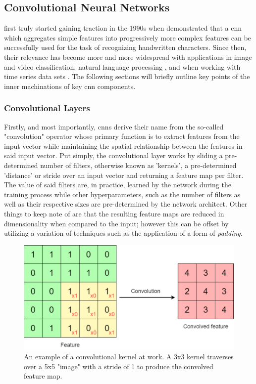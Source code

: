\subsection{Convolutional Neural Networks}
\label{subsec:Background-Information:Forecasting-Models:Convolutional-Neural-Networks}
 first truly started gaining traction in the 1990s when \citet{LeCun} demonstrated that a \gls{cnn} which aggregates simple features into progressively more complex features can be successfully used for the task of recognizing handwritten characters. Since then, their relevance has become more and more widespread with applications in image and video classification, natural language processing \cite{Collobert}, and when working with time series data sets \cite{Tsantekidis}. The following sections will briefly outline key points of the inner machinations of key \gls{cnn} components.

\subsubsection{Convolutional Layers}
\label{subsubsec:Background-Information:Forecasting-Models:Convolutional-Neural-Networks:Convolutional-Layers}
Firstly, and most importantly, \glspl{cnn} derive their name from the so-called "convolution" operator whose primary function is to extract features from the input vector while maintaining the spatial relationship between the features in said input vector. Put simply, the convolutional layer works by sliding a pre-determined number of filters, otherwise known as 'kernels', a pre-determined 'distance' or stride over an input vector and returning a feature map per filter. The value of said filters are, in practice, learned by the network during the training process while other hyperparameters, such as the number of filters as well as their respective sizes are pre-determined by the network architect. Other things to keep note of are that the resulting feature maps are reduced in dimensionality when compared to the input; however this can be offset by utilizing a variation of techniques such as the application of a form of \textit{padding}.

\begin{figure}[hbt!]
    \centering
    \includegraphics[width=\textwidth]{Images/Chapter 3/CNN/Convolution-Illustration.pdf}
    \caption{An example of a convolutional kernel at work. A 3x3 kernel traverses over a 5x5 "image" with a stride of 1 to produce the convolved feature map.}
    \label{fig:Convolution-Illustration}
\end{figure}

